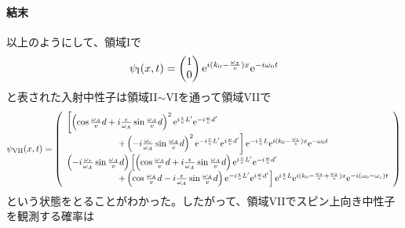 \paragraph{結末}
以上のようにして、領域Iで
\begin{equation}
\psi_\mathrm{I}(x,t)=\begin{pmatrix} 1\\0\end{pmatrix} \mathrm{e}^{i (k_0-\frac{\omega_z}{v})x}\mathrm{e}^{-i\omega_0t}
\end{equation}
と表された入射中性子は領域II$\sim$VIを通って領域VIIで
\begin{equation}
\psi_\mathrm{VII}(x,t) =\left( \begin{array}{l} \left[\left(\cos \frac{\omega_A}{v}d +i\frac{\epsilon}{\omega_A} \sin \frac{\omega_A}{v}d\right)^2\mathrm{e}^{i\frac{\epsilon}{v}L'}\mathrm{e}^{-i\frac{\omega}{v}d'} \right. \\ \hspace{2cm}\left. +\left(-i \frac{\omega_r}{\omega_A} \sin \frac{\omega_A}{v}d\right)^2\mathrm{e}^{-i\frac{\epsilon}{v}L'}\mathrm{e}^{i\frac{\omega}{v}d'} \right]\mathrm{e}^{-i\frac{\epsilon}{v}L}\mathrm{e}^{i(k_0-\frac{\omega_z}{v})x} \mathrm{e}^{-\omega_0t} \\ \left(-i \frac{\omega_r}{\omega_A} \sin \frac{\omega_A}{v}d\right) \left[\left(\cos \frac{\omega_A}{v}d +i\frac{\epsilon}{\omega_A} \sin \frac{\omega_A}{v}d\right) \mathrm{e}^{i\frac{\epsilon}{v}L'}\mathrm{e}^{-i\frac{\omega}{v}d'} \right. \\ \hspace{2cm} \left. +\left(\cos \frac{\omega_A}{v}d -i\frac{\epsilon}{\omega_A} \sin \frac{\omega_A}{v}d\right) \mathrm{e}^{-i\frac{\epsilon}{v}L'}\mathrm{e}^{i\frac{\omega}{v}d'} \right] \mathrm{e}^{i\frac{\epsilon}{v}L} \mathrm{e}^{i(k_0-\frac{\omega_s}{v}+\frac{\omega_z}{v})x} \mathrm{e}^{-i(\omega_0-\omega_s) t} \end{array}\right)
\end{equation}
という状態をとることがわかった。したがって、領域VIIでスピン上向き中性子を観測する確率は
